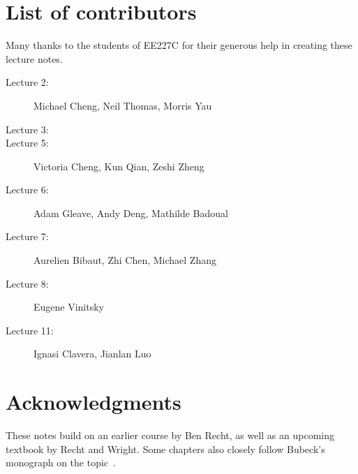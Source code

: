 \section{List of contributors}

Many thanks to the students of EE227C for their generous help in creating these
lecture notes.

\begin{description}
\item[Lecture 2:] Michael Cheng, Neil Thomas, Morris Yau
\item[Lecture 3:]
\item[Lecture 5:] Victoria Cheng, Kun Qian, Zeshi Zheng
\item[Lecture 6:] Adam Gleave, Andy Deng, Mathilde Badoual
\item[Lecture 7:] Aurelien Bibaut, Zhi Chen, Michael Zhang
\item[Lecture 8:] Eugene Vinitsky
\item[Lecture 11:] Ignasi Clavera, Jianlan Luo
\end{description}

\section{Acknowledgments}

These notes build on an earlier course by Ben Recht, as well as an upcoming
textbook by Recht and Wright. Some chapters also closely follow Bubeck's
monograph on the topic~\cite{Bubeck}.
